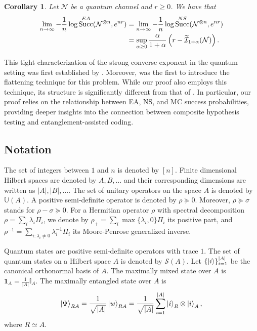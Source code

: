 \documentclass[a4paper,onecolumn,11pt,accepted=2025-10-01]{quantumarticle}
\newtheorem{cor}[theorem]{Corollary}
\DeclareMathOperator{\suc}{Succ}
\newcommand*{\bid}{\mathbf{1}}
\newcommand*{\cI}{\mathcal{I}}
\newcommand*{\dI}{\mathbb{I}}
\newcommand*{\cN}{\mathcal{N}}
\newcommand*{\cS}{\mathcal{S}}
\newcommand*{\mge}{\succcurlyeq}
\begin{document}
\begin{cor}\label{cor-intro:Q-EA-exponent}
 Let  $\cN$ be a  quantum channel and $r\ge 0$. We have that
    \begin{align}\label{intro:Q-EA-exponent}
        \lim_{n\rightarrow \infty} -\frac{1}{n}\log\suc^{\rm{EA}}(\cN^{\otimes n},e^{nr})
        &=  \lim_{n\rightarrow \infty} -\frac{1}{n}\log\suc^{\rm{NS}}(\cN^{\otimes n},e^{nr})
        \\&= \sup_{\alpha\ge 0}  \frac{\alpha}{1+\alpha}\left( r- \widetilde{\cI}_{1+\alpha}(\cN)\right).
    \end{align}
\end{cor}

This tight characterization of the strong converse exponent in the quantum setting was first established by \cite{Li2023Nov}. Moreover, \cite{Li2023Nov} was the first to introduce the flattening technique for this problem. While our proof also employs this technique, its structure is significantly different from that of \cite{Li2023Nov}. In particular, our proof relies on the relationship between EA, NS, and MC success probabilities, providing deeper insights into the connection between composite hypothesis testing and entanglement-assisted coding.


\subsection{Notation}

The set of integers between $1$ and $n$ is denoted by $[n]$.
Finite dimensional Hilbert spaces are denoted by $A,B, \dots$ and their corresponding  dimensions are written as  $|A|, |B|, \dots$. The set of unitary operators on the space $A$ is denoted by $\mathbb{U}(A)$. 
A positive semi-definite operator is denoted by $\rho \mge 0$. Moreover, $\rho\mge \sigma$ stands for $\rho-\sigma\mge 0$. For a Hermitian operator $\rho$ with spectral decomposition $\rho = \sum_i \lambda_i \Pi_i $, we denote by $\rho_+ = \sum_{i} \max\{\lambda_i,0\} \Pi_i $  its positive  part, and $\rho^{-1} = \sum_{i : \lambda_i\neq 0} \lambda_i^{-1} \Pi_i $ its Moore-Penrose generalized inverse.

Quantum states are positive semi-definite operators with trace $1$. The set of quantum states on a Hilbert space $A$ is denoted by $\cS(A)$. Let $\{\ket{i}\}_{i=1}^{|A|}$ be the canonical orthonormal basis of $A$. The maximally mixed state over $A$ is $\bid_A = \frac{1}{|A|}\dI_A$. The maximally entangled state over $A$ is
\begin{align}
\ket{\Psi}_{RA} =\frac{1}{\sqrt{|A|}} \ket{w}_{RA}  = \frac{1}{\sqrt{|A|}} \sum_{i=1}^{|A|} \ket{i}_{R}\otimes \ket{i}_A,
\end{align}
where $R\simeq A$. 
\end{document}
